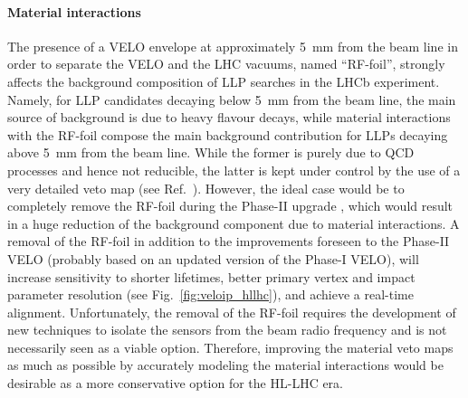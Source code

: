 \paragraph{Material interactions}

The presence of a VELO envelope at approximately 5~mm from the beam line in order to separate the VELO and the LHC vacuums, named ``RF-foil'', strongly affects the background composition of LLP searches in the LHCb experiment. Namely, for LLP candidates decaying below 5~mm from the beam line, the main source of background is due to heavy flavour decays, while material interactions with the RF-foil compose the main background contribution for LLPs decaying above 5~mm from the beam line. While the
former is purely due to QCD processes and hence not reducible, the latter is kept under control by the use of a very detailed veto map (see Ref.~\cite{Aaij:2017rft}). However, the ideal case would be to completely remove the RF-foil during the Phase-II upgrade \cite{Aaij:2244311}, which would result in a huge reduction of the background component due to material interactions. A removal of the RF-foil in addition to the improvements foreseen to the Phase-II VELO (probably based on an updated
version of the Phase-I VELO), will increase sensitivity to shorter lifetimes, better primary vertex and impact parameter resolution (see Fig.~\ref{fig:veloip_hllhc}), and achieve a real-time alignment. Unfortunately, the removal of the RF-foil requires the development of new techniques to isolate the sensors from the beam radio frequency and is not necessarily seen as a viable option. Therefore, improving the material veto maps as much as possible by accurately modeling the material interactions would be desirable as a more conservative option for the HL-LHC era.

